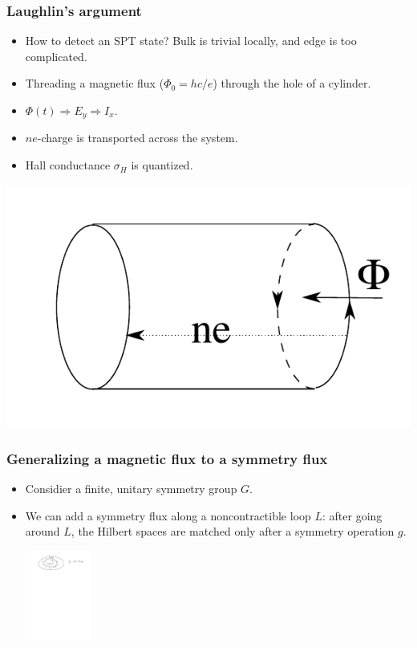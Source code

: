 \documentclass[xcolor=table, aspectratio=43,ignorenonframetext]{beamer}
\begin{document}
\begin{frame}
	\frametitle{Laughlin's argument}
	\begin{itemize}
		\item How to detect an SPT state? Bulk is trivial locally, and edge is too complicated.
		\item Threading a magnetic flux ($\Phi_0 = hc/e$) through the hole of a cylinder.
		\item $\Phi(t)\Rightarrow E_y\Rightarrow I_x$.
		\item $ne$-charge is transported across the system.
		\item Hall conductance $\sigma_H$ is quantized.
	\end{itemize}
	\includegraphics[scale=.8]{../spt-lecture/laughlin}
\end{frame}

\begin{frame}
	\frametitle{Generalizing a magnetic flux to a symmetry flux}
	\begin{itemize}
		\item Considier a finite, unitary symmetry group $G$.
		\item We can add a symmetry flux along a noncontractible loop $L$: after going around $L$, the Hilbert spaces are matched only after a symmetry operation $g$.
		\begin{center}
			\includegraphics[height=3cm]{g-bundle}
		\end{center}
	\end{itemize}
\end{frame}
\end{document}
